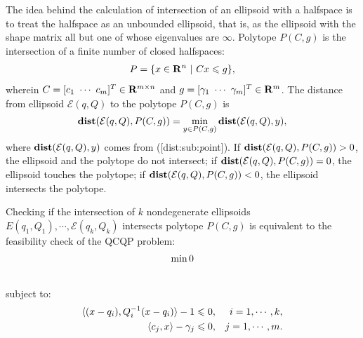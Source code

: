 \documentclass[letterpaper,10pt,english]{sphinxmanual}
\begin{document}
The idea behind the calculation of intersection of an ellipsoid with a
halfspace is to treat the halfspace as an unbounded ellipsoid, that is,
as the ellipsoid with the shape matrix all but one of whose eigenvalues
are $\infty$.
Polytope $P(C,g)$ is the
intersection of a finite number of closed halfspaces:
\label{main_source:equation-polytope}\begin{gather}
\begin{split}P = \{x\in{\bf R}^n ~|~ Cx\leqslant g\},\end{split}\label{main_source-polytope}
\end{gather}
wherein $C=[c_1 ~ \cdots ~ c_m]^T\in{\bf R}^{m\times n}$ and
$g=[\gamma_1 ~ \cdots ~ \gamma_m]^T\in{\bf R}^m$.
The distance
from ellipsoid ${\mathcal E}(q,Q)$ to the polytope $P(C,g)$
is
\label{main_source:equation-dist_poly}\begin{gather}
\begin{split}{\bf dist}({\mathcal E}(q,Q),P(C,g))=\min_{y\in P(C,g)}{\bf dist}({\mathcal E}(q,Q),y),\end{split}\label{main_source-dist_poly}
\end{gather}
where ${\bf dist}({\mathcal E}(q,Q),y)$ comes from
({[}dist:sub:\emph{p}oint{]}). If
${\bf dist}({\mathcal E}(q,Q),P(C,g))>0$, the ellipsoid and the
polytope do not intersect; if
${\bf dist}({\mathcal E}(q,Q),P(C,g))=0$, the ellipsoid touches
the polytope; if ${\bf dist}({\mathcal E}(q,Q),P(C,g))<0$, the
ellipsoid intersects the polytope.

Checking if the intersection of $k$ nondegenerate ellipsoids
$E(q_1,Q_1),\cdots,{\mathcal E}(q_k,Q_k)$ intersects polytope
$P(C,g)$ is equivalent to the feasibility check of the QCQP
problem:
\begin{gather}
\begin{split}\min 0\end{split}\notag\\\begin{split}\end{split}\notag
\end{gather}
subject to:
\begin{gather}
\begin{split}\begin{aligned}
\langle (x-q_i),Q_i^{-1}(x-q_i)\rangle - 1 \leqslant0, & & i=1,\cdots,k,\\
\langle c_j, x\rangle - \gamma_j \leqslant0, & & j=1,\cdots,m.\end{aligned}\end{split}\notag
\end{gather}
\end{document}
